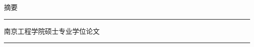 
\newcommand{\fakeheader}[1]{%
    \vspace*{-2cm}
    \begin{center}
        \zihao{-5}\songti #1\\[-10pt] 
        \rule{\textwidth}{0.4pt} 
    \end{center}
    \vspace{-0.5cm} 
}

\renewcommand{\abstractname}{\songti \zihao{3}\heiti 摘\quad 要}
\renewcommand{\absnamepos}{center}


\newcommand{\enabstractname}{\songti \zihao{3}\textbf{ABSTRACT}}
\newenvironment{englishabstract}{%
    \renewcommand{\abstractname}{\enabstractname}
    \begin{abstract}
}{%
    \end{abstract}
}

\date{}


\fakeheader{摘要} 
\begin{abstract}
    \thispagestyle{plain}
    
    \setlength{\parindent}{2em}
    \setlength{\baselineskip}{20pt}

   \songti {}本文研究了电力系统中非线性负载及仿真发电设备的建模与仿真分析方法。首先，基于\ldots（此处填写摘要内容，300字左右）。针对\ldots 问题，提出了\ldots 方法。实验结果表明，所提方法能有效\ldots（结论）。本研究对\ldots 具有重要意义。
    
    \vspace{1em}
    {\noindent\heiti 关键词：} 电力系统；非线性负载；仿真建模；谐波分析
\end{abstract}

\newpage
\newcommand{\header}[1]{%
    \vspace*{-2cm} 
    \begin{center}
        \zihao{-5}\songti #1\\[-10pt] 
        \rule{\textwidth}{0.4pt}
    \end{center}
    \vspace{-0.5cm} 
}

\header{南京工程学院硕士专业学位论文}
\begin{englishabstract} %
    \thispagestyle{plain}
    
    \setlength{\parindent}{0em}
    \setlength{\baselineskip}{20pt}
    
    \songti {} This paper investigates the modeling and simulation analysis methods for nonlinear loads and simulation generating equipment in power systems. Firstly, \ldots (英文摘要内容，与中文对应). To address \ldots, a \ldots method is proposed. Experimental results show that \ldots (结论). This study is significant for \ldots.
    
    \vspace{1em}
    {\noindent \textbf{Keywords:}} power system; nonlinear load; simulation modeling; harmonic analysis
\end{englishabstract}
\restoregeometry




\clearpage
\thispagestyle{fancy} %
\begin{spacing}{1}
    \tableofcontents
\end{spacing}
\thispagestyle{fancy} %
\newpage


